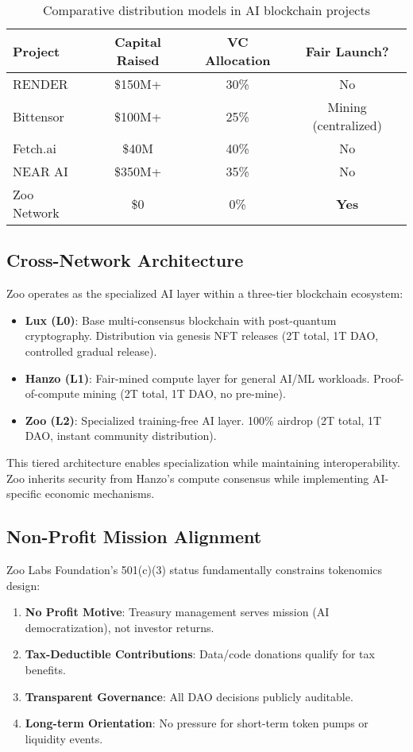 \documentclass[11pt,letterpaper]{article}
\theoremstyle{definition}
\theoremstyle{remark}
\begin{document}
\begin{table}[h]
\centering
\begin{tabular}{lccc}
\toprule
\textbf{Project} & \textbf{Capital Raised} & \textbf{VC Allocation} & \textbf{Fair Launch?} \\
\midrule
RENDER & \$150M+ & 30\% & No \\
Bittensor & \$100M+ & 25\% & Mining (centralized) \\
Fetch.ai & \$40M & 40\% & No \\
NEAR AI & \$350M+ & 35\% & No \\
Zoo Network & \$0 & 0\% & \textbf{Yes} \\
\bottomrule
\end{tabular}
\caption{Comparative distribution models in AI blockchain projects}
\label{tab:comparison}
\end{table}

\subsection{Cross-Network Architecture}

Zoo operates as the specialized AI layer within a three-tier blockchain ecosystem:

\begin{itemize}
\item \textbf{Lux (L0)}: Base multi-consensus blockchain with post-quantum cryptography. Distribution via genesis NFT releases (2T total, 1T DAO, controlled gradual release).
\item \textbf{Hanzo (L1)}: Fair-mined compute layer for general AI/ML workloads. Proof-of-compute mining (2T total, 1T DAO, no pre-mine).
\item \textbf{Zoo (L2)}: Specialized training-free AI layer. 100\% airdrop (2T total, 1T DAO, instant community distribution).
\end{itemize}

This tiered architecture enables specialization while maintaining interoperability. Zoo inherits security from Hanzo's compute consensus while implementing AI-specific economic mechanisms.

\subsection{Non-Profit Mission Alignment}

Zoo Labs Foundation's 501(c)(3) status fundamentally constrains tokenomics design:

\begin{enumerate}
\item \textbf{No Profit Motive}: Treasury management serves mission (AI democratization), not investor returns.
\item \textbf{Tax-Deductible Contributions}: Data/code donations qualify for tax benefits.
\item \textbf{Transparent Governance}: All DAO decisions publicly auditable.
\item \textbf{Long-term Orientation}: No pressure for short-term token pumps or liquidity events.
\end{enumerate}
\end{document}
